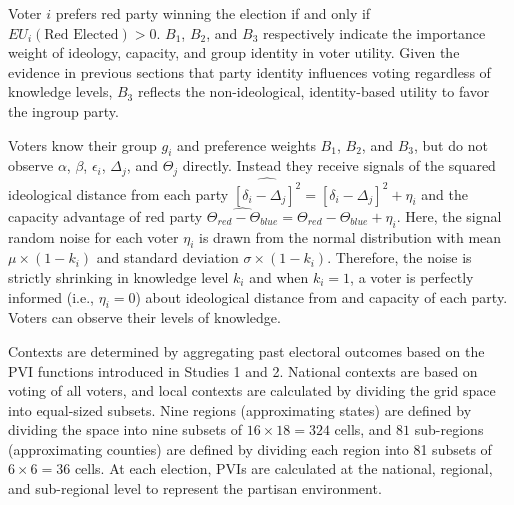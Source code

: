\documentclass[letterpaper, 12pt]{article}
\begin{document}
    \noindent Voter $i$ prefers red party winning the election if and only if $EU_i(\mbox{Red Elected}) > 0$. $B_1$, $B_2$, and $B_3$ respectively indicate the importance weight of ideology, capacity, and group identity in voter utility. Given the evidence in previous sections that party identity influences voting regardless of knowledge levels, $B_3$ reflects the non-ideological, identity-based utility to favor the ingroup party. 
    
    \par Voters know their group $g_i$ and preference weights $B_1$, $B_2$, and $B_3$, but do not observe $\alpha$, $\beta$, $\epsilon_i$, $\Delta_j$, and $\Theta_j$ directly. Instead they receive signals of the squared ideological distance from each party $\widehat{[\delta_i-\Delta_j]^2}=[\delta_i-\Delta_j]^2 + \eta_i$ and the capacity advantage of red party $\widehat{\Theta_{red}-\Theta_{blue}}= \Theta_{red} - \Theta_{blue} + \eta_i$. Here, the signal random noise for each voter $\eta_i$ is drawn from the normal distribution with mean $\mu \times (1-k_i)$ and standard deviation $\sigma \times (1-k_i)$. Therefore, the noise is strictly shrinking in knowledge level $k_i$ and when $k_i=1$, a voter is perfectly informed (i.e., $\eta_i=0$) about ideological distance from and capacity of each party. Voters can observe their levels of knowledge. 

    \par Contexts are determined by aggregating past electoral outcomes based on the PVI functions introduced in Studies 1 and 2. National contexts are based on voting of all voters, and local contexts are calculated by dividing the grid space into equal-sized subsets. Nine regions (approximating states) are defined by dividing the space into nine subsets of $16\times18 = 324$ cells, and $81$ sub-regions (approximating counties) are defined by dividing each region into 81 subsets of $6\times6 = 36$ cells. At each election, PVIs are calculated at the national, regional, and sub-regional level to represent the partisan environment. 
    
\end{document}
